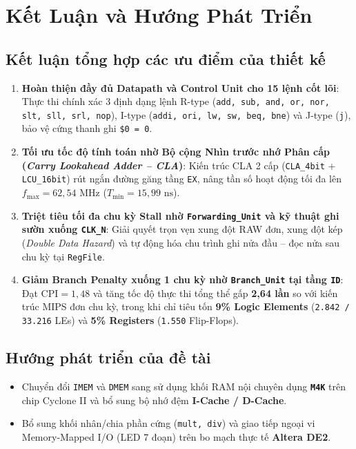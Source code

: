\documentclass[12pt,a4paper]{report}
\begin{document}
\chapter{Kết Luận và Hướng Phát Triển}

\section{Kết luận tổng hợp các ưu điểm của thiết kế}
\begin{enumerate}
    \item \textbf{Hoàn thiện đầy đủ Datapath và Control Unit cho 15 lệnh cốt lõi}: Thực thi chính xác 3 định dạng lệnh R-type (\texttt{add, sub, and, or, nor, slt, sll, srl, nop}), I-type (\texttt{addi, ori, lw, sw, beq, bne}) và J-type (\texttt{j}), bảo vệ cứng thanh ghi \texttt{\$0 = 0}.
    \item \textbf{Tối ưu tốc độ tính toán nhờ Bộ cộng Nhìn trước nhớ Phân cấp (\textit{Carry Lookahead Adder -- CLA})}: Kiến trúc CLA 2 cấp (\texttt{CLA\_4bit} + \texttt{LCU\_16bit}) rút ngắn đường găng tầng \texttt{EX}, nâng tần số hoạt động tối đa lên \textbf{$f_{\max} = 62,54\text{ MHz}$} ($T_{\min} = 15,99\text{ ns}$).
    \item \textbf{Triệt tiêu tối đa chu kỳ Stall nhờ \texttt{Forwarding\_Unit} và kỹ thuật ghi sườn xuống \texttt{CLK\_N}}: Giải quyết trọn vẹn xung đột RAW đơn, xung đột kép (\textit{Double Data Hazard}) và tự động hóa chu trình ghi nửa đầu -- đọc nửa sau chu kỳ tại \texttt{RegFile}.
    \item \textbf{Giảm Branch Penalty xuống 1 chu kỳ nhờ \texttt{Branch\_Unit} tại tầng \texttt{ID}}: Đạt $\text{CPI} = 1,48$ và tăng tốc độ thực thi tổng thể gấp \textbf{2,64 lần} so với kiến trúc MIPS đơn chu kỳ, trong khi chỉ tiêu tốn \textbf{9\% Logic Elements} (\texttt{2.842 / 33.216} LEs) và \textbf{5\% Registers} (\texttt{1.550} Flip-Flops).
\end{enumerate}
\section{Hướng phát triển của đề tài}
\begin{itemize}
    \item Chuyển đổi \texttt{IMEM} và \texttt{DMEM} sang sử dụng khối RAM nội chuyên dụng \textbf{\texttt{M4K}} trên chip Cyclone II và bổ sung bộ nhớ đệm \textbf{I-Cache / D-Cache}.
    \item Bổ sung khối nhân/chia phần cứng (\texttt{mult, div}) và giao tiếp ngoại vi Memory-Mapped I/O (LED 7 đoạn) trên bo mạch thực tế \textbf{Altera DE2}.
\end{itemize}
\end{document}
